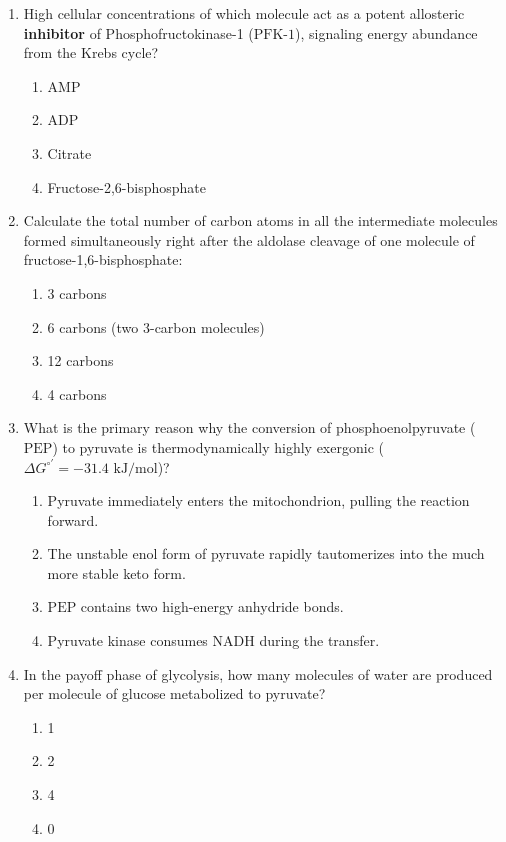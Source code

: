 \documentclass[11pt, a4paper]{article}
\begin{document}
\begin{enumerate}[label=\textbf{\arabic*.}]
\item High cellular concentrations of which molecule act as a potent allosteric \textbf{inhibitor} of Phosphofructokinase-1 ($\text{PFK-1}$), signaling energy abundance from the Krebs cycle?
\begin{enumerate}[label=(\Alph*)]
    \item $\text{AMP}$
    \item $\text{ADP}$
    \item Citrate
    \item Fructose-2,6-bisphosphate
\end{enumerate}

\item Calculate the total number of carbon atoms in all the intermediate molecules formed simultaneously right after the aldolase cleavage of one molecule of fructose-1,6-bisphosphate:
\begin{enumerate}[label=(\Alph*)]
    \item 3 carbons
    \item 6 carbons (two 3-carbon molecules)
    \item 12 carbons
    \item 4 carbons
\end{enumerate}

\item What is the primary reason why the conversion of phosphoenolpyruvate ($\text{PEP}$) to pyruvate is thermodynamically highly exergonic ($\Delta G^{\circ\prime} = -31.4\text{ kJ/mol}$)?
\begin{enumerate}[label=(\Alph*)]
    \item Pyruvate immediately enters the mitochondrion, pulling the reaction forward.
    \item The unstable enol form of pyruvate rapidly tautomerizes into the much more stable keto form.
    \item $\text{PEP}$ contains two high-energy anhydride bonds.
    \item Pyruvate kinase consumes $\text{NADH}$ during the transfer.
\end{enumerate}

\item In the payoff phase of glycolysis, how many molecules of water are produced per molecule of glucose metabolized to pyruvate?
\begin{enumerate}[label=(\Alph*)]
    \item 1
    \item 2
    \item 4
    \item 0
\end{enumerate}


\end{enumerate}
\end{document}
